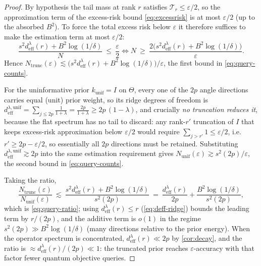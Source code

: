 \documentclass[aps,prxquantum,reprint,amsmath,amssymb,floatfix,nofootinbib,superscriptaddress,longbibliography]{revtex4-2}
\theoremstyle{remark}
\begin{document}
\begin{proof}
By hypothesis the tail mass at rank \(r\) satisfies
\(\mathcal T_r\le\varepsilon/2\), so the approximation term of the excess-risk
bound \eqref{eq:excessrisk} is at most \(\varepsilon/2\) (up to the absorbed
\(B^2\)).  To force the total excess risk below \(\varepsilon\) it therefore
suffices to make the estimation term at most \(\varepsilon/2\):
\[
    \frac{s^2 d_{\mathrm{eff}}^{\lambda}(r)+B^2\log(1/\delta)}{N}
    \ \le\ \frac{\varepsilon}{2}
    \iff
    N\ \ge\ \frac{2\bigl(s^2 d_{\mathrm{eff}}^{\lambda}(r)
    +B^2\log(1/\delta)\bigr)}{\varepsilon}.
\]
Hence \(N_{\mathrm{trunc}}(\varepsilon)\lesssim
\bigl(s^2 d_{\mathrm{eff}}^{\lambda}(r)+B^2\log(1/\delta)\bigr)/\varepsilon\),
the first bound in \cref{eq:query-counts}.

For the uninformative prior \(k_{\mathrm{unif}}=I\) on \(\Theta\), every one of
the \(2p\) angle directions carries equal (unit) prior weight, so its ridge
degrees of freedom is
\(d_{\mathrm{eff}}^{\lambda,\mathrm{unif}}=\sum_{j\le 2p}\tfrac{1}{1+\lambda}
=\tfrac{2p}{1+\lambda}\ge 2p\,(1-\lambda)\), and crucially \emph{no truncation
reduces it}, because the flat spectrum has no tail to discard: any rank-\(r'\)
truncation of \(I\) that keeps excess-risk approximation below \(\varepsilon/2\)
would require \(\sum_{j>r'}1\le\varepsilon/2\), i.e.\ \(r'\ge 2p-\varepsilon/2\),
so essentially all \(2p\) directions must be retained.  Substituting
\(d_{\mathrm{eff}}^{\lambda,\mathrm{unif}}\gtrsim 2p\) into the same estimation
requirement gives \(N_{\mathrm{unif}}(\varepsilon)\gtrsim s^2(2p)/\varepsilon\),
the second bound in \cref{eq:query-counts}.

Taking the ratio,
\[
    \frac{N_{\mathrm{trunc}}(\varepsilon)}{N_{\mathrm{unif}}(\varepsilon)}
    \ \lesssim\
    \frac{s^2 d_{\mathrm{eff}}^{\lambda}(r)+B^2\log(1/\delta)}{s^2(2p)}
    \ =\ \frac{d_{\mathrm{eff}}^{\lambda}(r)}{2p}
    +\frac{B^2\log(1/\delta)}{s^2(2p)},
\]
which is \cref{eq:query-ratio}; using \(d_{\mathrm{eff}}^{\lambda}(r)\le r\)
(\cref{eq:deff-ridge}) bounds the leading term by \(r/(2p)\), and the additive
term is \(o(1)\) in the regime \(s^2(2p)\gg B^2\log(1/\delta)\) (many directions
relative to the prior energy).  When the operator spectrum is concentrated,
\(d_{\mathrm{eff}}^{\lambda}(r)\ll 2p\) by \cref{cor:decay}, and the ratio is
\(\approx d_{\mathrm{eff}}^{\lambda}(r)/(2p)\ll1\): the truncated prior reaches
\(\varepsilon\)-accuracy with that factor fewer quantum objective queries.
\end{proof}



\end{document}

